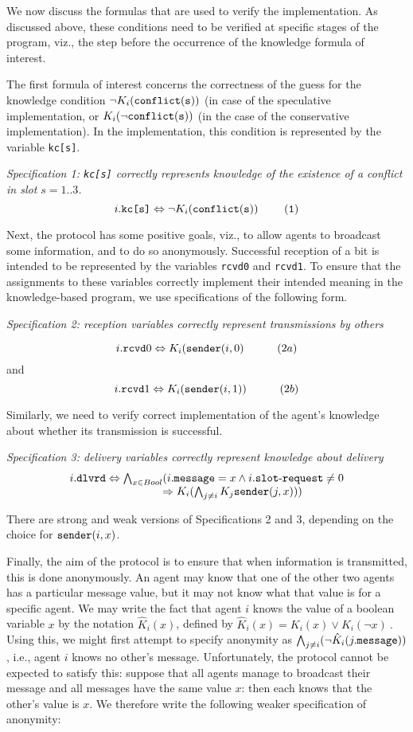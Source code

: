\documentclass[]{llncs}
\newcommand{\dlvrd}{{\tt dlvrd}}
\newcommand{\sender}{{\tt sender}}
\newcommand{\rcvd}{{\tt rcvd}}
\newcommand{\rimp}{\Rightarrow}
\newcommand{\dimp}{\Leftrightarrow}
\newcommand{\slotrequest}{{\tt slot\mbox{-}request}}
\newcommand{\msg}{{\tt message}}
\newcommand{\conflict}{\tt conflict}
\begin{document}
We now discuss the formulas that are used to verify the implementation.  
As discussed above, these conditions need to be verified at specific stages of the program, 
viz., the step before the occurrence of the knowledge formula of interest. 

The first formula of interest concerns the correctness of the 
guess for the knowledge condition $\neg K_i(\conflict(s))$ (in case of the 
speculative implementation, or $K_i(\neg \conflict(s))$ (in the case of the 
conservative implementation). In the implementation, 
this condition is represented by the variable \verb+kc[s]+. 

\textit{Specification 1:
{\tt kc[s]}  correctly represents knowledge of the existence of a conflict in slot $s=1..3$. }
$$ i.\verb+kc[s]+ \dimp \neg K_{i} (\conflict(s))~~~~~~~(1)$$


Next, the protocol has some positive goals, viz., to allow agents to broadcast some 
information, and to do so anonymously. Successful reception of a bit 
 is intended to be represented by the variables 
 \verb+rcvd0+ and \verb+rcvd1+. 
To ensure that the assignments to these variables correctly implement their
intended meaning in the knowledge-based program, we use specifications of the
following form. 

\textit{Specification 2: reception variables  correctly represent transmissions by others} 

$$ i.\rcvd0 \dimp K_i(\sender(i,0) ~~~~~~~~~(2a)$$ 
and 
$$ i.\rcvd1 \dimp K_i(\sender(i,1)) ~~~~~~~~~ (2b)$$ 

Similarly, we need to verify correct implementation of the agent's knowledge about whether its transmission is 
successful.  

\textit{Specification 3: delivery variables  correctly represent knowledge about delivery} 
$$
\begin{array}{l} 
 i.\dlvrd \dimp 
\bigwedge_{x\in Bool} (i.\msg = x  \land i.\slotrequest \neq 0\\
~~~~~~~~~~~~~~~~~~~~~~~~~ \rimp K_i ( \bigwedge_{j\neq i} K_j\sender(j,x)))
\end{array} 
$$

There are strong and weak versions of Specifications 2 and 3, depending on the choice for $\sender(i,x)$. 

Finally, the aim of the protocol is to ensure that when information is transmitted, this 
is done anonymously. An agent may know that one of the other two agents 
has a particular message value, but it may not know what that value is
for a specific agent. We may write the fact that agent $i$ knows the 
value of a boolean variable $x$ by the notation $\hat{K}_i(x)$, defined 
by $\hat{K}_i(x) = K_i(x) \lor K_i(\neg x)~.$
Using this, we might first attempt to specify anonymity as
$\bigwedge_{j\neq i} ( \neg \hat{K}_i(j.\msg))$, i.e., agent $i$ knows no other's message. 
Unfortunately, the protocol cannot be expected to satisfy this: suppose that 
all agents manage to broadcast their message and all messages have the same value
$x$: then each knows that the other's value is $x$. We therefore write the 
following weaker specification of anonymity: 
\end{document}
